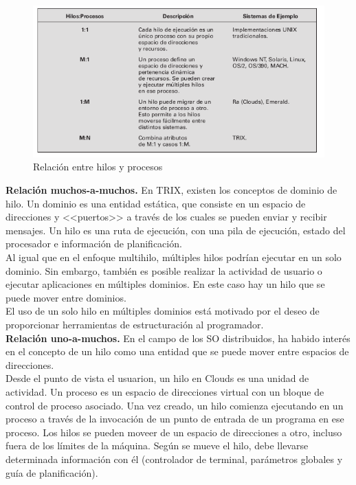 \documentclass{article}
\begin{document}
					\begin{figure}
					\caption{Relación entre hilos y procesos}
					\label{figura2.19:rel-hilos-procesos}
					\centering
					\includegraphics[width=1\textwidth, scale=1]{tema_2_figura19.png}
					\end{figure}
					
					\textbf{Relación muchos-a-muchos.} En TRIX, existen los conceptos de dominio de hilo. Un dominio es una entidad estática, que consiste en un espacio de direcciones y <<puertos>> a través de los cuales se pueden enviar y recibir mensajes. Un hilo es una ruta de ejecución, con una pila de ejecución, estado del procesador e información de planificación. \\
					
					Al igual que en el enfoque multihilo, múltiples hilos podrían ejecutar en un solo dominio. Sin embargo, también es posible realizar la actividad de usuario o ejecutar aplicaciones en múltiples dominios. En este caso hay un hilo que se puede mover entre dominios. \\
					
					El uso de un solo hilo en múltiples dominios está motivado por el deseo de proporcionar herramientas de estructuración al programador. \\
					
					\textbf{Relación uno-a-muchos.} En el campo de los SO distribuidos, ha habido interés en el concepto de un hilo como una entidad que se puede mover entre espacios de direcciones. \\
					
					Desde el punto de vista el usuarion, un hilo en Clouds es una unidad de actividad. Un proceso es un espacio de direcciones virtual con un bloque de control de proceso asociado. Una vez creado, un hilo comienza ejecutando en un proceso a través de la invocación de un punto de entrada de un programa en ese proceso. Los hilos se pueden moveer de un espacio de direcciones a otro, incluso fuera de los límites de la máquina. Según se mueve el hilo, debe llevarse determinada información con él (controlador de terminal, parámetros globales y guía de planificación). \\
					
\end{document}
